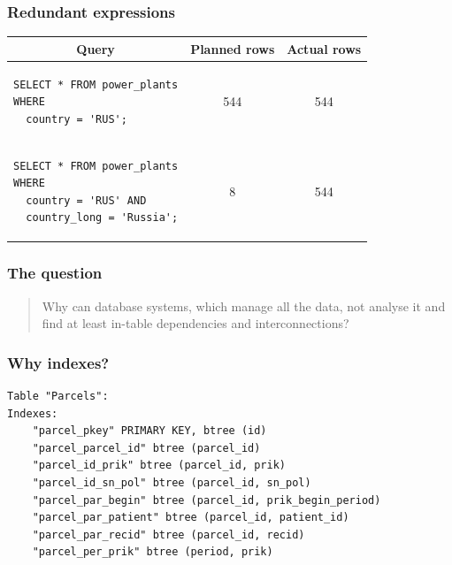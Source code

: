 \documentclass[xcolor=table]{beamer}
\begin{document}
\begin{frame}[fragile]\frametitle{Redundant expressions}
\begin{center}
\begin{tabular}{|l|c|c|}
	\hline
	\multicolumn{1}{|c|}{Query} & Planned rows & Actual rows \\
	\hline
\begin{lstlisting}[basicstyle=\footnotesize]
SELECT * FROM power_plants
WHERE
  country = 'RUS';
\end{lstlisting}
& \cellcolor{green}544 & \cellcolor{green}544 \\
	\hline
\begin{lstlisting}[basicstyle=\footnotesize]
SELECT * FROM power_plants
WHERE
  country = 'RUS' AND
  country_long = 'Russia';
\end{lstlisting}
& \cellcolor{red}8 & \cellcolor{green}544 \\
	\hline
\end{tabular}
\end{center}
\end{frame}

%
%
\begin{frame}[fragile]\frametitle{The question}
\begin{quote}
Why can database systems, which manage all the data, not analyse it and find at least in-table dependencies and interconnections?
\end{quote}
\end{frame}

%
%
\begin{frame}[fragile]\frametitle{Why indexes?}
\begin{lstlisting}[basicstyle=\footnotesize]
Table "Parcels":
Indexes:
    "parcel_pkey" PRIMARY KEY, btree (id)
    "parcel_parcel_id" btree (parcel_id)
    "parcel_id_prik" btree (parcel_id, prik)
    "parcel_id_sn_pol" btree (parcel_id, sn_pol)
    "parcel_par_begin" btree (parcel_id, prik_begin_period)
    "parcel_par_patient" btree (parcel_id, patient_id)
    "parcel_par_recid" btree (parcel_id, recid)
    "parcel_per_prik" btree (period, prik)
\end{lstlisting}
\end{frame}
\end{document}
